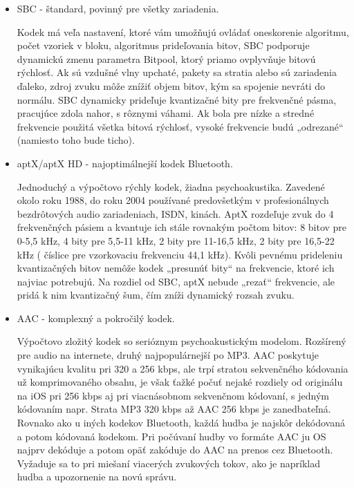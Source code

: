 \documentclass[10pt,twoside,slovak,a4paper]{article}
\begin{document}
\begin{itemize}
\item SBC - štandard, povinný pre všetky zariadenia. \cite{ValdikSS}

Kodek má veľa nastavení, ktoré vám umožňujú ovládať oneskorenie algoritmu, počet vzoriek v bloku, algoritmus prideľovania bitov, SBC podporuje dynamickú zmenu parametra Bitpool, ktorý priamo ovplyvňuje bitovú rýchlosť. Ak sú vzdušné vlny upchaté, pakety sa stratia alebo sú zariadenia ďaleko, zdroj zvuku môže znížiť objem bitov, kým sa spojenie nevráti do normálu. SBC dynamicky prideľuje kvantizačné bity pre frekvenčné pásma, pracujúce zdola nahor, s rôznymi váhami. Ak bola pre nízke a stredné frekvencie použitá všetka bitová rýchlosť, vysoké frekvencie budú „odrezané“ (namiesto toho bude ticho).

\item aptX/aptX HD - najoptimálnejší kodek Bluetooth.\cite{ValdikSS}

Jednoduchý a výpočtovo rýchly kodek, žiadna psychoakustika. Zavedené okolo roku 1988, do roku 2004 používané predovšetkým v profesionálnych bezdrôtových audio zariadeniach, ISDN, kinách. AptX rozdeľuje zvuk do 4 frekvenčných pásiem a kvantuje ich stále rovnakým počtom bitov: 8 bitov pre 0-5,5 kHz, 4 bity pre 5,5-11 kHz, 2 bity pre 11-16,5 kHz, 2 bity pre 16,5-22 kHz ( číslice pre vzorkovaciu frekvenciu 44,1 kHz). Kvôli pevnému prideleniu kvantizačných bitov nemôže kodek „presunúť bity“ na frekvencie, ktoré ich najviac potrebujú. Na rozdiel od SBC, aptX nebude „rezať“ frekvencie, ale pridá k nim kvantizačný šum, čím zníži dynamický rozsah zvuku.

\item AAC - komplexný a pokročilý kodek.\cite{ValdikSS}

Výpočtovo zložitý kodek so serióznym psychoakustickým modelom. Rozšírený pre audio na internete, druhý najpopulárnejší po MP3. 
AAC poskytuje vynikajúcu kvalitu pri 320 a 256 kbps, ale trpí stratou sekvenčného kódovania už komprimovaného obsahu, je však ťažké počuť nejaké rozdiely od originálu na iOS pri 256 kbps aj pri viacnásobnom sekvenčnom kódovaní, s jedným kódovaním napr. Strata MP3 320 kbps až AAC 256 kbps je zanedbateľná. Rovnako ako u iných kodekov Bluetooth, každá hudba je najskôr dekódovaná a potom kódovaná kodekom. Pri počúvaní hudby vo formáte AAC ju OS najprv dekóduje a potom opäť zakóduje do AAC na prenos cez Bluetooth. Vyžaduje sa to pri miešaní viacerých zvukových tokov, ako je napríklad hudba a upozornenie na novú správu.

\end{itemize}
 
\end{document}
